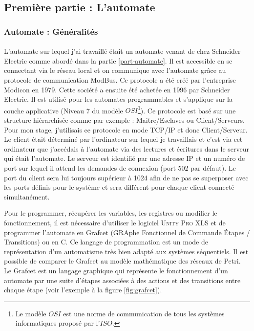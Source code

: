 \subsection{Première partie : L'automate}
    \subsubsection{Automate : Généralités}
        \paragraph*{}
        L'automate sur lequel j'ai travaillé était un automate venant de chez Schneider Electric comme abordé dans la partie \ref{part-automate}. Il est accessible en se connectant via le réseau local et on communique avec l'automate grâce au protocole de communication ModBus. Ce protocole a été créé par l'entreprise Modicon en 1979. Cette société a ensuite été achetée en 1996 par Schneider Electric. Il est utilisé pour les automates programmables et s'applique sur la couche applicative (Niveau 7 du modèle $OSI$\footnote{Le modèle $OSI$ est une norme de communication de tous les systèmes informatiques proposé par l'$ISO$.}). Ce protocole est basé sur une structure hiérarchisée comme par exemple : Maitre/Esclaves ou Client/Serveurs. Pour mon stage, j'utilisais ce protocole en mode TCP/IP et donc Client/Serveur. Le client était déterminé par l'ordinateur sur lequel je travaillais et c'est via cet ordinateur que j'accédais à l'automate via des lectures et écritures dans le serveur qui était l'automate. Le serveur est identifié par une adresse IP et un numéro de port sur lequel il attend les demandes de connexion (port 502 par défaut). Le port du client sera lui toujours supérieur à 1024 afin de ne pas se superposer avec les ports définis pour le système et sera différent pour chaque client connecté simultanément.
        
        \label{part:unityPro}
        Pour le programmer, récupérer les variables, les registres ou modifier le fonctionnement, il est nécessaire d'utiliser le logiciel \textsc{Unity Pro XLS}  et de programmer l'automate en Grafcet (GRAphe Fonctionnel de Commande Étapes / Transitions) ou en C. Ce langage de programmation est un mode de représentation d'un automatisme très bien adapté aux systèmes séquentiels. Il est possible de comparer le Grafcet au modèle mathématique des réseaux de Petri. Le Grafcet est un langage graphique qui représente le fonctionnement d'un automate par une suite d'étapes associées à des actions et des transitions entre chaque étape (voir l'exemple à la figure \ref{fig:grafcet}).
        

